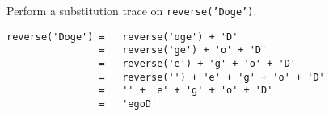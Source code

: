 Perform a substitution trace on \texttt{reverse('Doge')}.

\begin{answer}
\begin{lstlisting}[numbers=none]
reverse('Doge')	=	reverse('oge') + 'D'
				=	reverse('ge') + 'o' + 'D'
				=	reverse('e') + 'g' + 'o' + 'D'
				=	reverse('') + 'e' + 'g' + 'o' + 'D'
				=	'' + 'e' + 'g' + 'o' + 'D'
				=	'egoD'
\end{lstlisting}
\end{answer}